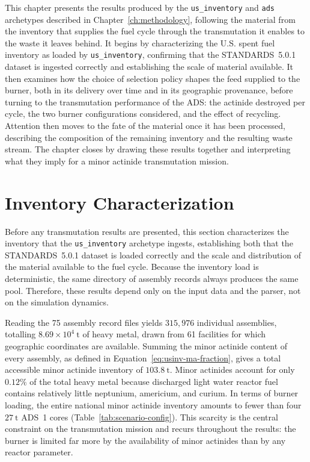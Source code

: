 This chapter presents the results produced by the \texttt{us\_inventory} and
\texttt{ads} archetypes described in Chapter~\ref{ch:methodology}, following the
material from the inventory that supplies the fuel cycle through the
transmutation it enables to the waste it leaves behind. It begins by
characterizing the U.S. spent fuel inventory as loaded by \texttt{us\_inventory},
confirming that the \gls{STANDARDS}~5.0.1 dataset is ingested correctly and
establishing the scale of material available. It then examines how the choice of
selection policy shapes the feed supplied to the burner, both in its delivery
over time and in its geographic provenance, before turning to the transmutation
performance of the \gls{ADS}: the actinide destroyed per cycle, the two burner
configurations considered, and the effect of recycling. Attention then moves to
the fate of the material once it has been processed, describing the composition
of the remaining inventory and the resulting waste stream. The chapter closes by
drawing these results together and interpreting what they imply for a
minor actinide transmutation mission.

\section{Inventory Characterization}
\label{sec:results-baseline}

Before any transmutation results are presented, this section characterizes the
inventory that the \texttt{us\_inventory} archetype ingests, establishing both
that the \gls{STANDARDS}~5.0.1 dataset is loaded correctly and the scale and
distribution of the material available to the fuel cycle. Because the inventory
load is deterministic, the same directory of assembly records always produces
the same pool. Therefore, these results depend only on the input data and the
parser, not on the simulation dynamics.

Reading the 75 assembly record files yields $315{,}976$ individual assemblies,
totalling $8.69\times10^{4}~\mathrm{t}$ of heavy metal, drawn from 61 facilities
for which geographic coordinates are available. Summing the minor actinide
content of every assembly, as defined in Equation~\ref{eq:usinv-ma-fraction},
gives a total accessible minor actinide inventory of $103.8~\mathrm{t}$. Minor
actinides account for only $0.12\%$ of the total heavy metal because discharged
light water reactor fuel contains relatively little neptunium, americium, and
curium. In terms of burner loading, the entire national minor actinide inventory
amounts to fewer than four $27~\mathrm{t}$ ADS~1 cores
(Table~\ref{tab:scenario-config}). This scarcity is the central constraint on
the transmutation mission and recurs throughout the results: the burner is
limited far more by the availability of minor actinides than by any reactor
parameter.

